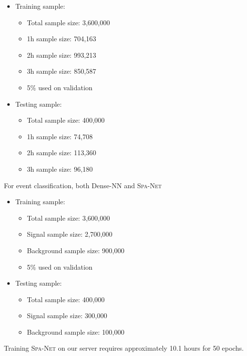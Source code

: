 \documentclass[12pt]{article}
\begin{document}
    \begin{itemize}
        \item Training sample:
        \begin{itemize}
            \item Total sample size: 3,600,000
            \item 1h sample size: 704,163
            \item 2h sample size: 993,213
            \item 3h sample size: 850,587
            \item 5\% used on validation
        \end{itemize}
        \item Testing sample:
        \begin{itemize}
            \item Total sample size: 400,000
            \item 1h sample size: 74,708
            \item 2h sample size: 113,360
            \item 3h sample size: 96,180
        \end{itemize}
    \end{itemize}

    For event classification, both Dense-NN and \textsc{Spa-Net}
    \begin{itemize}
        \item Training sample:
        \begin{itemize}
            \item Total sample size: 3,600,000
            \item Signal sample size: 2,700,000
            \item Background sample size: 900,000
            \item 5\% used on validation
        \end{itemize}
        \item Testing sample:
        \begin{itemize}
            \item Total sample size: 400,000
            \item Signal sample size: 300,000
            \item Background sample size: 100,000
        \end{itemize}
    \end{itemize}

    Training \textsc{Spa-Net} on our server requires approximately 10.1 hours for 50 epochs.
\end{document}
